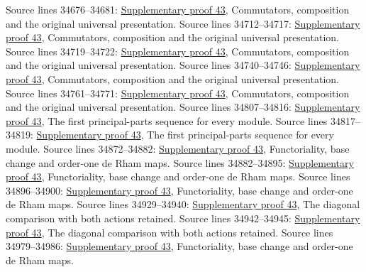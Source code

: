 \begin{AlgebraSourceRoutes}
 Source lines 34676--34681: \hyperlink{algebra_diff_operators_notes_20260928}{Supplementary proof 43}, Commutators, composition and the original universal presentation.
 Source lines 34712--34717: \hyperlink{algebra_diff_operators_notes_20260928}{Supplementary proof 43}, Commutators, composition and the original universal presentation.
 Source lines 34719--34722: \hyperlink{algebra_diff_operators_notes_20260928}{Supplementary proof 43}, Commutators, composition and the original universal presentation.
 Source lines 34740--34746: \hyperlink{algebra_diff_operators_notes_20260928}{Supplementary proof 43}, Commutators, composition and the original universal presentation.
 Source lines 34761--34771: \hyperlink{algebra_diff_operators_notes_20260928}{Supplementary proof 43}, Commutators, composition and the original universal presentation.
 Source lines 34807--34816: \hyperlink{algebra_diff_operators_notes_20260928}{Supplementary proof 43}, The first principal-parts sequence for every module.
 Source lines 34817--34819: \hyperlink{algebra_diff_operators_notes_20260928}{Supplementary proof 43}, The first principal-parts sequence for every module.
 Source lines 34872--34882: \hyperlink{algebra_diff_operators_notes_20260928}{Supplementary proof 43}, Functoriality, base change and order-one de Rham maps.
 Source lines 34882--34895: \hyperlink{algebra_diff_operators_notes_20260928}{Supplementary proof 43}, Functoriality, base change and order-one de Rham maps.
 Source lines 34896--34900: \hyperlink{algebra_diff_operators_notes_20260928}{Supplementary proof 43}, Functoriality, base change and order-one de Rham maps.
 Source lines 34929--34940: \hyperlink{algebra_diff_operators_notes_20260928}{Supplementary proof 43}, The diagonal comparison with both actions retained.
 Source lines 34942--34945: \hyperlink{algebra_diff_operators_notes_20260928}{Supplementary proof 43}, The diagonal comparison with both actions retained.
 Source lines 34979--34986: \hyperlink{algebra_diff_operators_notes_20260928}{Supplementary proof 43}, Functoriality, base change and order-one de Rham maps.

\end{AlgebraSourceRoutes}
